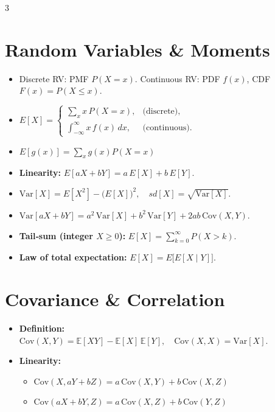 \documentclass[10pt,landscape]{article}
\begin{document}
\begin{multicols}{3}
\section{Random Variables \& Moments}
\begin{itemize}
  \item Discrete RV: PMF $P(X=x)$. Continuous RV: PDF $f(x)$, CDF $F(x)=P(X\le x)$.
  \item $\displaystyle E[X]=\begin{cases} \sum_x x\,P(X=x), & \text{(discrete)},\\[2pt]
        \displaystyle\int_{-\infty}^{\infty} x\,f(x)\,dx, & \text{(continuous)}.\end{cases}$
  \item $E[g(x)] = \sum_x g(x) P(X=x)$
  \item \textbf{Linearity:} $\displaystyle E[aX + bY] = a\,E[X] + b\,E[Y].$
  \item $\displaystyle \mathrm{Var}[X] = E[X^2] - \bigl(E[X]\bigr)^2,\quad sd[X]=\sqrt{\mathrm{Var}[X]}.$
  \item $\displaystyle \mathrm{Var}[aX + bY] = a^2\,\mathrm{Var}[X] + b^2\,\mathrm{Var}[Y] + 2ab\,\mathrm{Cov}(X,Y).$
  \item \textbf{Tail‐sum (integer $X\ge0$):} $\displaystyle E[X] = \sum_{k=0}^{\infty} P(X > k).$
  \item \textbf{Law of total expectation:} $\displaystyle E[X] = E\bigl[E[X\mid Y]\bigr].$
\end{itemize}

\section{Covariance \& Correlation}
\begin{itemize}
  \item \textbf{Definition:} 
    $\displaystyle \mathrm{Cov}(X,Y) = \mathbb{E}[XY] - \mathbb{E}[X]\,\mathbb{E}[Y], \quad \mathrm{Cov}(X, X) = \mathrm{Var}[X].$
    
  \item \textbf{Linearity:} 
    \begin{itemize}
      \item $\displaystyle \mathrm{Cov}(X, aY + bZ) = a\,\mathrm{Cov}(X,Y) + b\,\mathrm{Cov}(X,Z)$
      \item $\displaystyle \mathrm{Cov}(aX + bY, Z) = a\,\mathrm{Cov}(X,Z) + b\,\mathrm{Cov}(Y,Z)$
    \end{itemize}


\end{itemize}
\end{multicols}
\end{document}
